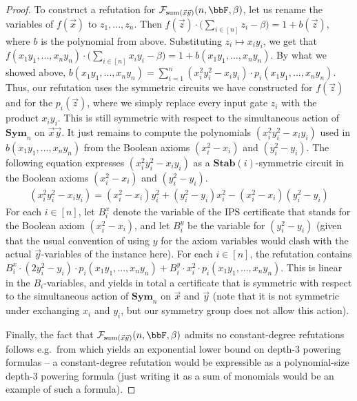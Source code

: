 \documentclass[10pt,a4paper]{article}
\newcommand{\Sym}{{\mathbf{Sym}}}
\newcommand{\Ff}{{\cal F}}
\newcommand{\Stab}{\mathbf{Stab}}
\begin{document}
\begin{proof}
	To construct a refutation for $\Ff_{\text{sum}(\vec x\vec y)}(n,\bbF,\beta)$, let us rename the variables of $f(\vec x)$ to $z_1,...,z_n$. Then $f(\vec z) \cdot \Big(\sum_{i \in [n]} z_i - \beta \Big) = 1+b(\vec z)$, where $b$ is the polynomial from above. Substituting $z_i \mapsto x_iy_i$, we get that $f(x_1y_1,...,x_ny_n) \cdot \Big(\sum_{i \in [n]} x_iy_i - \beta \Big) = 1+b(x_1y_1,...,x_ny_n)$. By what we showed above, $b(x_1y_1,...,x_ny_n) = \sum_{i=1}^n (x_i^2y_i^2-x_iy_i) \cdot p_i(x_1y_1,...,x_ny_n)$. Thus, our refutation uses the symmetric circuits we have constructed for $f(\vec z)$ and for the $p_i(\vec z)$, where we simply replace every input gate $z_i$ with the product $x_iy_i$. This is still symmetric with respect to the simultaneous action of $\Sym_n$ on $\vec x\vec y$. 
	It just remains to compute the polynomials $(x_i^2y_i^2-x_iy_i)$ used in $b(x_1y_1,...,x_ny_n)$ from the Boolean axioms $(x_i^2-x_i)$ and $(y_i^2-y_i)$. The following equation expresses $(x_i^2y_i^2-x_iy_i)$ as a $\Stab(i)$-symmetric circuit in the Boolean axioms $(x_i^2-x_i)$ and $(y_i^2-y_i)$.
	\begin{align*}
		(x_i^2y_i^2-x_iy_i) = (x_i^2-x_i)y_i^2 + (y_i^2-y_i)x_i^2-(x_i^2-x_i)(y_i^2-y_i)
	\end{align*}	
	For each $i \in [n]$, let $B_i^x$ denote the variable of the IPS certificate that stands for the Boolean axiom $(x_i^2-x_i)$, and let $B_i^y$ be the variable for  $(y_i^2-y_i)$ (given that the usual convention of using $y$ for the axiom variables would clash with the actual $\vec y$-variables of the instance here).
	For each $i \in [n]$, the refutation contains $B_i^x \cdot (2y_i^2 - y_i) \cdot p_i(x_1y_1,...,x_ny_n) + B_i^y \cdot x_i^2  \cdot p_i(x_1y_1,...,x_ny_n)$. This is linear in the $B_i$-variables, and yields in total a certificate that is symmetric with respect to the simultaneous action of $\Sym_n$ on $\vec x$ and $\vec y$ (note that it is not symmetric under exchanging $x_i$ and $y_i$, but our symmetry group does not allow this action).
	
	Finally, the fact that $\Ff_{\text{sum}(\vec x\vec y)}(n,\bbF,\beta)$ admits no constant-degree refutations follows e.g.\ from \cite[Corollary 5.9]{lowerbounds_IPS} which yields an exponential lower bound on depth-3 powering formulas -- a constant-degree refutation would be expressible as a polynomial-size depth-3 powering formula (just writing it as a sum of monomials would be an example of such a formula).
\end{proof}	
\end{document}
